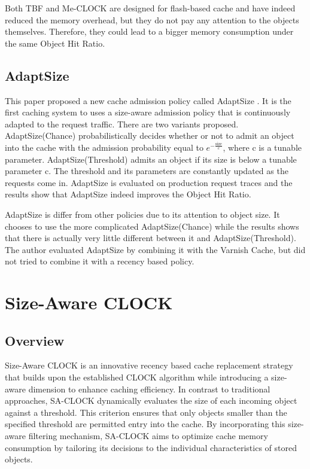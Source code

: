 \documentclass[journal,10.5pt,onecolumn]{IEEEtran}
\begin{document}
Both TBF and Me-CLOCK are designed for flash-based cache and have indeed reduced the memory overhead, but they do not pay any attention to the objects themselves. Therefore, they could lead to a bigger memory consumption under the same Object Hit Ratio.

\subsection{AdaptSize}
This paper proposed a new cache admission policy called AdaptSize \cite{b4}. It is the first caching system to uses a size-aware admission policy that is continuously adapted to the request traffic. There are two variants proposed. AdaptSize(Chance) probabilistically decides whether or not to admit an object into the cache with the admission probability equal to $e^{-\frac{\text{size}}{c}}$, where c is a tunable parameter. AdaptSize(Threshold) admits an object if its size is below a tunable parameter c. The threshold and its parameters are constantly updated as the requests come in. AdaptSize is evaluated on production request traces and the results show that AdaptSize indeed improves the Object Hit Ratio.

AdaptSize is differ from other policies due to its attention to object size. It chooses to use the more complicated AdaptSize(Chance) while the results shows that there is actually very little different between it and AdaptSize(Threshold). The author evaluated AdaptSize by combining it with the Varnish Cache, but did not tried to combine it with a recency based policy.

\section{Size-Aware CLOCK}
\subsection{Overview}
Size-Aware CLOCK is an innovative recency based cache replacement strategy that builds upon the established CLOCK algorithm while introducing a size-aware dimension to enhance caching efficiency. In contrast to traditional approaches, SA-CLOCK dynamically evaluates the size of each incoming object against a threshold. This criterion ensures that only objects smaller than the specified threshold are permitted entry into the cache. By incorporating this size-aware filtering mechanism, SA-CLOCK aims to optimize cache memory consumption by tailoring its decisions to the individual characteristics of stored objects.
\end{document}
